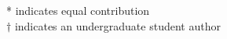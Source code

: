 \documentclass[letterpaper,11pt]{article}
\newlength{\outerbordwidth}
\newcommand{\resheading}[1]{\vspace{8pt}
  \parbox{\textwidth}{
  \setlength{\FrameSep}{\outerbordwidth}
\setlength{\fboxsep}{0pt}
\framebox[\textwidth][l]{\setlength{\fboxsep}{4pt}\fcolorbox{shadecolorB}{shadecolorB}{\textbf{\sffamily{\mbox{~}\makebox[6.262in][l]{\large #1} \vphantom{p\^{E}}}}}}
  }
  \vspace{-5pt}
}
\begin{document}
* indicates equal contribution \\
$\dagger$ indicates an undergraduate student author


\begin{comment}
\resheading{Oral Presentations}
\begin{etaremune}[itemsep=-2pt]
	\item \textbf{Hamilton JJ}, Garcia SL, Brown BS, Oyserman BO, Moya F, Bertilsson S, Malmstrom RR, Forest KT, and KD McMahon. \emph{Microbial Ecosystems Biology: A Framework for Scaling from Genomes to Ecosystems}. Association of Environmental Engineering and Science Professors Research and Education Conference. Ann Arbor, MI, June 2017.
	\item \textbf{Hamilton JJ}. \emph{Diving Into Freshwater Microbial Genomes to Infer
Bacterial Traits}. Wisconsin Ecology 22nd Annual Fall Symposium. Madison, WI, October 2016.
	\item \textbf{Hamilton JJ} and JL Reed. \emph{Thermodynamics and H$_2$ Transfer in a Methanogenic,
Syntrophic Community.} COBRA 2014: 3rd Conference on Constraint-Based Reconstruction and Analysis, Charlottesville, VA, May 2014.
	\item \textbf{Hamilton JJ} and JL Reed. \emph{Identification of Functional Differences in Cyanobacterial Metabolic Networks Using Constraint-Based Models.} American Society of Microbiology (ASM) General Meeting, Denver, CO, May 2013.
	\item \textbf{Hamilton JJ}, Dwivedi V, and JL Reed. \emph{Thermodynamics-Based Flux-Balance Analysis: Incorporation of Thermodynamic and Metabolomic Data Into Genome-Scale Constraint-Based Models.} American Institute of Chemical Engineers Annual Meeting, Pittsburgh, PA, October 2012.
	\item \textbf{Hamilton JJ} and JL Reed. \emph{Comparison of Microbial Metabolic Networks to Guide Background Strain Selection.} American Chemical Society National Meeting, San Diego, CA, March 2012.
	\item  \textbf{Hamilton JJ} and JL Reed. \emph{Genome Alignment and Pair-Wise Comparison of Microbial Metabolic Networks Identifies Novel Potential Drug Targets.} American Institute of Chemical Engineers Annual Meeting, Minneapolis, MN, October 2011.
\end{etaremune}
\end{comment}
\end{document}
